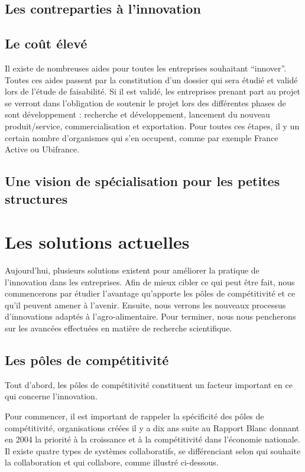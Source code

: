 \documentclass[a4paper,10pt]{report}
\begin{document}
		\subsection{Les contreparties à l'innovation}
			
		\subsection{Le coût élevé}
		Il existe de nombreuses aides pour toutes les entreprises souhaitant “innover”. Toutes ces aides passent par la constitution d’un dossier qui sera étudié et validé lors de l’étude de faisabilité. Si il est validé, les entreprises prenant part au projet se verront dans l’obligation de soutenir le projet lors des différentes phases de sont développement : recherche et développement, lancement du nouveau produit/service, commercialisation et exportation. Pour toutes ces étapes, il y un certain nombre d’organismes qui s’en occupent, comme par exemple France Active ou Ubifrance. 
				
		\subsection{Une vision de spécialisation pour les petites structures}
			
	\section{Les solutions actuelles}
		Aujourd’hui, plusieurs solutions existent pour améliorer la pratique de l’innovation dans les entreprises. Afin de mieux cibler ce qui peut être fait, nous commencerons par étudier l’avantage qu’apporte les pôles de compétitivité et ce qu’il peuvent amener à l’avenir. Ensuite, nous verrons les nouveaux processus d’innovations adaptés à l’agro-alimentaire. Pour terminer, nous nous pencherons sur les avancées effectuées en matière de recherche scientifique.
		
		\subsection{Les pôles de compétitivité}
		Tout d’abord, les pôles de compétitivité constituent un facteur important en ce qui concerne l’innovation.
		
		Pour commencer, il est important de rappeler la spécificité des pôles de compétitivité, organisations créées il y a dix ans suite au Rapport Blanc donnant en 2004 la priorité à la croissance et à la compétitivité dans l’économie nationale\cite{RapportBlanc}. Il existe quatre types de systèmes collaboratifs, se différenciant selon qui souhaite la collaboration et qui collabore, comme illustré ci-dessous\cite{PoleCompetitivite}.
		\vspace{11pt}
		
\end{document}
